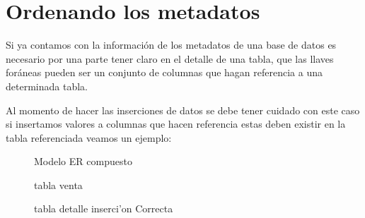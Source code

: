 \section{Ordenando los metadatos}
Si ya contamos con la informaci\'on de los metadatos de una base de datos es necesario por una parte tener claro en el detalle de una tabla, que las llaves for\'aneas pueden ser un conjunto de columnas que hagan referencia a una determinada tabla.

Al momento de hacer las inserciones de datos se debe tener cuidado con este caso si insertamos valores a columnas que hacen referencia estas deben existir en la tabla referenciada veamos un ejemplo:
\begin{figure}[H]
\centering
{}
\caption{Modelo ER compuesto} \label{fig:ModeloERcomp}
\end{figure}
\begin{figure}[H]
\centering
{}
\caption{tabla venta} \label{fig:tabla venta}
\end{figure}
\begin{figure}[H]
\centering
{}
\caption{tabla detalle inserci'on Correcta} \label{fig:InsercionCorrecta}
\end{figure}

